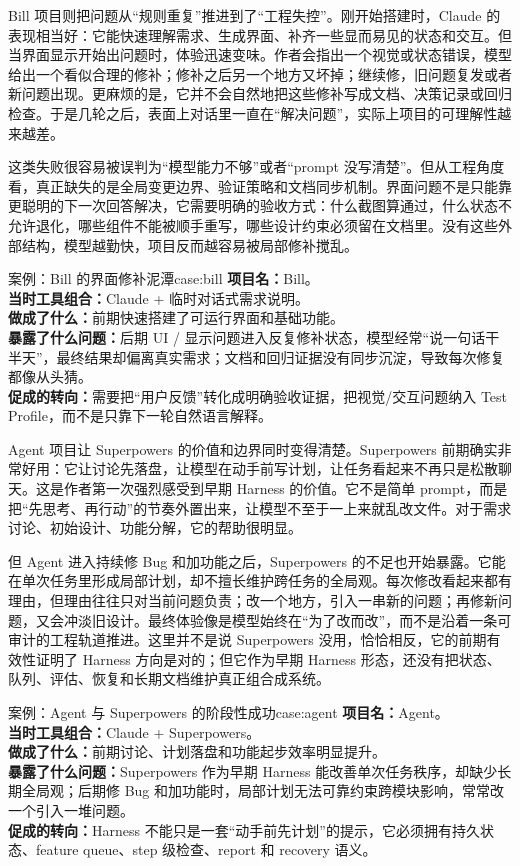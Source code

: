 \documentclass[
  outputdir=build,
  chapterstyle=cn,
  colorscheme=Simple,
  fontset=tech,
  code=false
]{Hypo-Note}
\begin{document}
Bill 项目则把问题从“规则重复”推进到了“工程失控”。刚开始搭建时，Claude 的表现相当好：它能快速理解需求、生成界面、补齐一些显而易见的状态和交互。但当界面显示开始出问题时，体验迅速变味。作者会指出一个视觉或状态错误，模型给出一个看似合理的修补；修补之后另一个地方又坏掉；继续修，旧问题复发或者新问题出现。更麻烦的是，它并不会自然地把这些修补写成文档、决策记录或回归检查。于是几轮之后，表面上对话里一直在“解决问题”，实际上项目的可理解性越来越差。

这类失败很容易被误判为“模型能力不够”或者“prompt 没写清楚”。但从工程角度看，真正缺失的是全局变更边界、验证策略和文档同步机制。界面问题不是只能靠更聪明的下一次回答解决，它需要明确的验收方式：什么截图算通过，什么状态不允许退化，哪些组件不能被顺手重写，哪些设计约束必须留在文档里。没有这些外部结构，模型越勤快，项目反而越容易被局部修补搅乱。

\begin{example}{案例：Bill 的界面修补泥潭}{case:bill}
\textbf{项目名：}Bill。\\
\textbf{当时工具组合：}Claude + 临时对话式需求说明。\\
\textbf{做成了什么：}前期快速搭建了可运行界面和基础功能。\\
\textbf{暴露了什么问题：}后期 UI / 显示问题进入反复修补状态，模型经常“说一句话干半天”，最终结果却偏离真实需求；文档和回归证据没有同步沉淀，导致每次修复都像从头猜。\\
\textbf{促成的转向：}需要把“用户反馈”转化成明确验收证据，把视觉/交互问题纳入 Test Profile，而不是只靠下一轮自然语言解释。
\end{example}

Agent 项目让 Superpowers 的价值和边界同时变得清楚。Superpowers 前期确实非常好用：它让讨论先落盘，让模型在动手前写计划，让任务看起来不再只是松散聊天。这是作者第一次强烈感受到早期 Harness 的价值。它不是简单 prompt，而是把“先思考、再行动”的节奏外置出来，让模型不至于一上来就乱改文件。对于需求讨论、初始设计、功能分解，它的帮助很明显。

但 Agent 进入持续修 Bug 和加功能之后，Superpowers 的不足也开始暴露。它能在单次任务里形成局部计划，却不擅长维护跨任务的全局观。每次修改看起来都有理由，但理由往往只对当前问题负责；改一个地方，引入一串新的问题；再修新问题，又会冲淡旧设计。最终体验像是模型始终在“为了改而改”，而不是沿着一条可审计的工程轨道推进。这里并不是说 Superpowers 没用，恰恰相反，它的前期有效性证明了 Harness 方向是对的；但它作为早期 Harness 形态，还没有把状态、队列、评估、恢复和长期文档维护真正组合成系统。

\begin{example}{案例：Agent 与 Superpowers 的阶段性成功}{case:agent}
\textbf{项目名：}Agent。\\
\textbf{当时工具组合：}Claude + Superpowers。\\
\textbf{做成了什么：}前期讨论、计划落盘和功能起步效率明显提升。\\
\textbf{暴露了什么问题：}Superpowers 作为早期 Harness 能改善单次任务秩序，却缺少长期全局观；后期修 Bug 和加功能时，局部计划无法可靠约束跨模块影响，常常改一个引入一堆问题。\\
\textbf{促成的转向：}Harness 不能只是一套“动手前先计划”的提示，它必须拥有持久状态、feature queue、step 级检查、report 和 recovery 语义。
\end{example}
\end{document}
